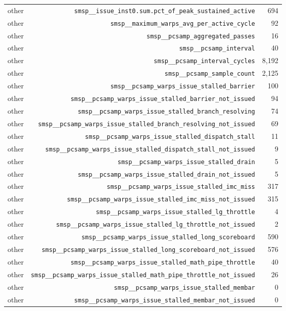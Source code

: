 \begin{table}[h]
\begin{tabular}{|l|r|r|}
other & \texttt{smsp__issue_inst0.sum.pct_of_peak_sustained_active} & 694 \\
other & \texttt{smsp__maximum_warps_avg_per_active_cycle} & 92 \\
other & \texttt{smsp__pcsamp_aggregated_passes} & 16 \\
other & \texttt{smsp__pcsamp_interval} & 40 \\
other & \texttt{smsp__pcsamp_interval_cycles} & 8,192 \\
other & \texttt{smsp__pcsamp_sample_count} & 2,125 \\
other & \texttt{smsp__pcsamp_warps_issue_stalled_barrier} & 100 \\
other & \texttt{smsp__pcsamp_warps_issue_stalled_barrier_not_issued} & 94 \\
other & \texttt{smsp__pcsamp_warps_issue_stalled_branch_resolving} & 74 \\
other & \texttt{smsp__pcsamp_warps_issue_stalled_branch_resolving_not_issued} & 69 \\
other & \texttt{smsp__pcsamp_warps_issue_stalled_dispatch_stall} & 11 \\
other & \texttt{smsp__pcsamp_warps_issue_stalled_dispatch_stall_not_issued} & 9 \\
other & \texttt{smsp__pcsamp_warps_issue_stalled_drain} & 5 \\
other & \texttt{smsp__pcsamp_warps_issue_stalled_drain_not_issued} & 5 \\
other & \texttt{smsp__pcsamp_warps_issue_stalled_imc_miss} & 317 \\
other & \texttt{smsp__pcsamp_warps_issue_stalled_imc_miss_not_issued} & 315 \\
other & \texttt{smsp__pcsamp_warps_issue_stalled_lg_throttle} & 4 \\
other & \texttt{smsp__pcsamp_warps_issue_stalled_lg_throttle_not_issued} & 2 \\
other & \texttt{smsp__pcsamp_warps_issue_stalled_long_scoreboard} & 590 \\
other & \texttt{smsp__pcsamp_warps_issue_stalled_long_scoreboard_not_issued} & 576 \\
other & \texttt{smsp__pcsamp_warps_issue_stalled_math_pipe_throttle} & 40 \\
other & \texttt{smsp__pcsamp_warps_issue_stalled_math_pipe_throttle_not_issued} & 26 \\
other & \texttt{smsp__pcsamp_warps_issue_stalled_membar} & 0 \\
other & \texttt{smsp__pcsamp_warps_issue_stalled_membar_not_issued} & 0 \\

\end{tabular}
\end{table}
